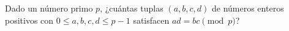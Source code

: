 Dado un número primo $p$, ¿cuántas tuplas $(a, b, c, d)$ de números enteros positivos con $0 \le a, b, c, d \le p-1$ satisfacen $ad = bc \pmod{p}$? 

